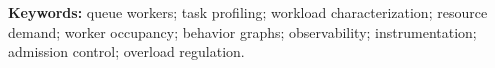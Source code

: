 \noindent\textbf{Keywords:}
queue workers; task profiling; workload characterization; resource demand; worker occupancy; behavior graphs; observability; instrumentation; admission control; overload regulation.
